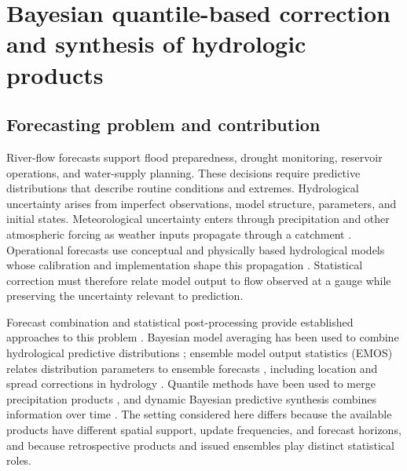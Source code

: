 \chapter{Bayesian quantile-based correction and synthesis of hydrologic products}
\label{ch:research-b}

\section{Forecasting problem and contribution}

River-flow forecasts support flood preparedness, drought monitoring, reservoir
operations, and water-supply planning. These decisions require predictive
distributions that describe routine conditions and extremes. Hydrological
uncertainty arises from imperfect observations, model structure, parameters,
and initial states. Meteorological uncertainty enters through precipitation
and other atmospheric forcing as weather inputs propagate through a catchment
\citep{env-thiboult2016accounting,env-tarek2021daily}. Operational forecasts
use conceptual and physically based hydrological models whose calibration and
implementation shape this propagation \citep{env-demargne2013science}.
Statistical correction must therefore relate model output to flow observed at
a gauge while preserving the uncertainty relevant to prediction.

Forecast combination and statistical post-processing provide established
approaches to this problem \citep{env-siegert2019forecast,env-vannitsem,
env-wang2022forecastcombinations50yearreview}. Bayesian model averaging has
been used to combine hydrological predictive distributions
\citep{env-duan2006bma}; ensemble model output statistics (EMOS) relates
distribution parameters to ensemble forecasts \citep{env-gneiting2005emos},
including location and spread corrections in hydrology
\citep{env-hemri2015multivariate}. Quantile methods have been used to merge
precipitation products \citep{env-yumnam2022quantile}, and dynamic Bayesian
predictive synthesis combines information over time
\citep{env-mcalinn2019dynamic}. The setting considered here differs because
the available products have different spatial support, update frequencies,
and forecast horizons, and because retrospective products and issued
ensembles play distinct statistical roles.

